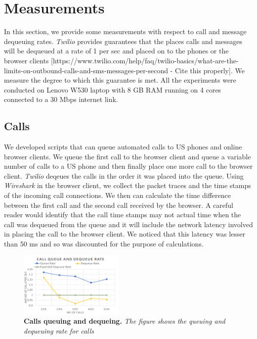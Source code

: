 \section{Measurements}
\label{sec-measurements}

In this section, we provide some measurements with respect to call and message dequeuing rates. \textit{Twilio} provides guarantees that the places calls and messages will be dequeued at a rate of 1 per sec and placed on to the phones or the browser clients [https://www.twilio.com/help/faq/twilio-basics/what-are-the-limits-on-outbound-calls-and-sms-messages-per-second - Cite this properly]. We measure the degree to which this guarantee is met. All the experiments were conducted on Lenovo W530 laptop with 8 GB RAM running on 4 cores connected to a 30 Mbps internet link.

\subsection{Calls}
\label{sec-measurements-calls}
We developed scripts that can queue automated calls to US phones and online browser clients. We queue the first call to the browser client and queue a variable number of calls to a US phone and then finally place one more call to the browser client. \textit{Twilio} deqeues the calls in the order it was placed into the queue. Using \textit{Wireshark} in the browser client, we collect the packet traces and the time stamps of the incoming call connections. We then can calculate the time difference between the first call and the second call received by the browser. A careful reader would identify that the call time stamps may not actual time when the call was dequeued from the queue and it will include the network latency involved in placing the call to the browser client. We noticed that this latency was lesser than 50 ms and so was discounted for the purpose of calculations. 

\begin{figure} \centering
\includegraphics[width=0.45\textwidth]{graphs/calls.pdf}
\caption{\textbf{Calls queuing and dequeing.} {\footnotesize\textit{
The figure shows the queuing and dequeuing rate for calls
}}}
\label{fig:sms}
\end{figure}

